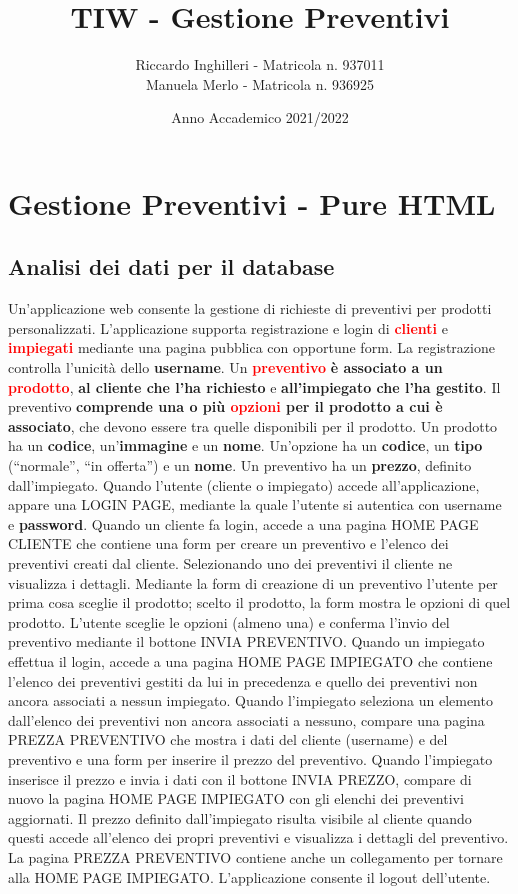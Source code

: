 \documentclass[a4paper, 12pt]{article}
\title{TIW - Gestione Preventivi}
\author{Riccardo Inghilleri - Matricola n. 937011\\Manuela Merlo - Matricola n. 936925}
\date{Anno Accademico 2021/2022}
\begin{document}

\tableofcontents
\newpage
\section{Gestione Preventivi - Pure HTML}
\subsection{Analisi dei dati per il database}
Un’applicazione web consente la gestione di richieste di preventivi per prodotti personalizzati. L’applicazione supporta registrazione e login di \textbf{\textcolor{red}{clienti}} e \textbf{\textcolor{red}{impiegati}} mediante una pagina pubblica con opportune form. La registrazione controlla l’unicità dello \textbf{\textcolor{myGreen}{username}}. Un \textbf{\textcolor{red}{preventivo}} \textbf{\textcolor{myBlue}{è associato a un}} \textbf{\textcolor{red}{prodotto}}, \textbf{\textcolor{myBlue}{al cliente che l’ha richiesto}} e \textbf{\textcolor{myBlue}{all’impiegato che l’ha gestito}}. Il preventivo \textbf{\textcolor{myBlue}{comprende una o più} \textcolor{red}{opzioni} \textcolor{myBlue}{per il prodotto a cui è associato}}, che devono essere tra quelle disponibili per il prodotto. Un prodotto ha un \textbf{\textcolor{myGreen}{codice}}, un’\textbf{\textcolor{myGreen}{immagine}} e un \textbf{\textcolor{myGreen}{nome}}. Un’opzione ha un \textbf{\textcolor{myGreen}{codice}}, un \textbf{\textcolor{myGreen}{tipo}} (“normale”, “in offerta”) e un \textbf{\textcolor{myGreen}{nome}}. Un preventivo ha un \textbf{\textcolor{myGreen}{prezzo}}, definito dall’impiegato. Quando l’utente (cliente o impiegato) accede all’applicazione, appare una LOGIN PAGE, mediante la quale l’utente si autentica con username e \textbf{\textcolor{myGreen}{password}}. Quando un cliente fa login, accede a una pagina HOME PAGE CLIENTE che contiene una form per creare un preventivo e l’elenco dei preventivi creati dal cliente. Selezionando uno dei preventivi il cliente ne visualizza i dettagli. Mediante la form di creazione di un preventivo l’utente per prima cosa sceglie il prodotto; scelto il prodotto, la form mostra le opzioni di quel prodotto. L’utente sceglie le opzioni (almeno una) e conferma l’invio del preventivo mediante il bottone INVIA PREVENTIVO. Quando un impiegato effettua il login, accede a una pagina HOME PAGE IMPIEGATO che contiene l’elenco dei preventivi gestiti da lui in precedenza e quello dei preventivi non ancora associati a nessun impiegato. Quando l’impiegato seleziona un elemento dall’elenco dei preventivi non ancora associati a nessuno, compare una pagina PREZZA PREVENTIVO che mostra i dati del cliente (username) e del preventivo e una form per inserire il prezzo del preventivo. Quando l’impiegato inserisce il prezzo e invia i dati con il bottone INVIA PREZZO, compare di nuovo la pagina HOME PAGE IMPIEGATO con gli elenchi dei preventivi aggiornati. Il prezzo definito dall’impiegato risulta visibile al cliente quando questi accede all’elenco dei propri preventivi e visualizza i dettagli del preventivo. La pagina PREZZA PREVENTIVO contiene anche un collegamento per tornare alla HOME PAGE IMPIEGATO. L’applicazione consente il logout dell’utente.\\
\end{document}
